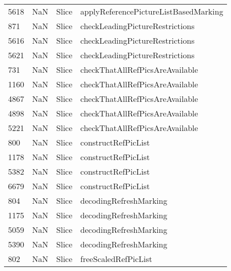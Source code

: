 \begin{tabular}{llll}
5618 &                   NaN &                      Slice &     applyReferencePictureListBasedMarking \\
871  &                   NaN &                      Slice &           checkLeadingPictureRestrictions \\
5616 &                   NaN &                      Slice &           checkLeadingPictureRestrictions \\
5621 &                   NaN &                      Slice &           checkLeadingPictureRestrictions \\
731  &                   NaN &                      Slice &           checkThatAllRefPicsAreAvailable \\
1160 &                   NaN &                      Slice &           checkThatAllRefPicsAreAvailable \\
4867 &                   NaN &                      Slice &           checkThatAllRefPicsAreAvailable \\
4898 &                   NaN &                      Slice &           checkThatAllRefPicsAreAvailable \\
5221 &                   NaN &                      Slice &           checkThatAllRefPicsAreAvailable \\
800  &                   NaN &                      Slice &                       constructRefPicList \\
1178 &                   NaN &                      Slice &                       constructRefPicList \\
5382 &                   NaN &                      Slice &                       constructRefPicList \\
6679 &                   NaN &                      Slice &                       constructRefPicList \\
804  &                   NaN &                      Slice &                    decodingRefreshMarking \\
1175 &                   NaN &                      Slice &                    decodingRefreshMarking \\
5059 &                   NaN &                      Slice &                    decodingRefreshMarking \\
5390 &                   NaN &                      Slice &                    decodingRefreshMarking \\
802  &                   NaN &                      Slice &                      freeScaledRefPicList \\

\end{tabular}
